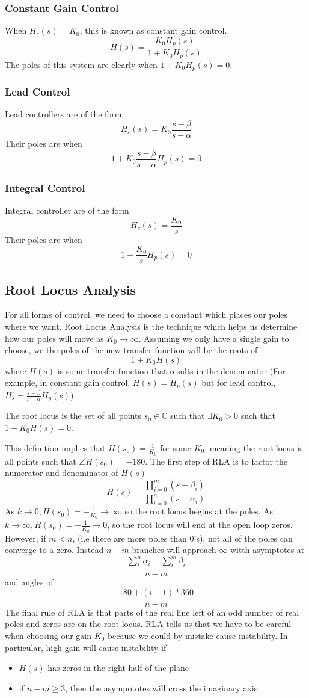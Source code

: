 \subsubsection{Constant Gain Control}
When $H_c(s) = K_0$, this is known as constant gain control.
\[
H(s) = \frac{K_0H_p(s)}{1+K_0H_p(s)}
\]
The poles of this system are clearly when $1+K_0H_p(s)=0$.
\subsubsection{Lead Control}
Lead controllers are of the form
\[
H_c(s) = K_0\frac{s-\beta}{s-\alpha}
\]
Their poles are when
\[
1 + K_0\frac{s-\beta}{s-\alpha}H_p(s) = 0
\]
\subsubsection{Integral Control}
Integral controller are of the form
\[
H_c(s) = \frac{K_0}{s}
\]
Their poles are when 
\[
1 + \frac{K_0}{s}H_p(s) = 0
\]
\subsection{Root Locus Analysis}
For all forms of control, we need to choose a constant which places our poles where we want. Root Locus Analysis
is the technique which helps us determine how our poles will move as $K_0\rightarrow \infty$.
Assuming we only have a single gain to choose, we the poles of the new transfer function will be the roots of
\[
1 + K_0H(s)
\] where $H(s)$ is some transfer function that results in the denominator (For example, in constant gain control, $H(s) = H_p(s)$ but for
lead control, $H_s = \frac{s-\beta}{s-\alpha}H_p(s)$).
\begin{definition}
    The root locus is the set of all points $s_0\in \mathbb{C}$ such that $\exists K_0>0$ such that $1+K_0H(s)=0$.
\end{definition}
This definition implies that $H(s_0)=\frac{1}{K_0}$ for some $K_0$, meaning the root locus is all points such that $\angle H(s_0)=-180$\textdegree.
The first step of RLA is to factor the numerator and denominator of $H(s)$
\[
H(s) = \frac{\prod_{i=0}^{m}{(s-\beta_i)}}{\prod_{i=0}^{n}{(s-\alpha_i)}}
\]
As $k\rightarrow 0, H(s_0)=-\frac{1}{K_0}\rightarrow \infty$, so the root locus begins at the poles.
As $k\rightarrow \infty, H(s_0)=-\frac{1}{K_0}\rightarrow 0$, so the root locus will end at the open loop zeros.
However, if $m < n$, (i.e there are more poles than 0's), not all of the poles can converge to a zero.
Instead $n-m$ branches will approach $\infty$ witth asymptotes at
\[
\frac{\sum_i^n\alpha_i-\sum_i^m\beta_i}{n-m}
\] and angles of
\[
\frac{180 + (i-1)*360}{n-m}
\]
The final rule of RLA is that parts of the real line left of an odd number of real poles and zeros are on the root locus.
RLA tells us that we have to be careful when choosing our gain $K_0$ because we could by mistake cause instability. In particular, high gain will cause instability if
\begin{itemize}
    \item $H(s)$ has zeros in the right half of the plane
    \item if $n-m \ge 3$, then the asympototes will cross the imaginary axis.
\end{itemize}
